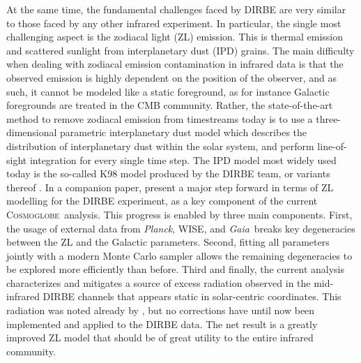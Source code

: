 \documentclass{aa}
\def\Planck{\textit{Planck}}
\def\GAIA{\textit{Gaia}}
\newcommand{\cosmoglobe}{\textsc{Cosmoglobe}}
\begin{document}
At the same time, the fundamental challenges faced by DIRBE are very similar to those faced by any other infrared experiment. In particular, the single most challenging aspect is the zodiacal light (ZL) emission. This is thermal emission and scattered sunlight from interplanetary dust (IPD) grains. The main difficulty when dealing with zodiacal emission contamination in infrared data is that the observed emission is highly dependent on the position of the observer, and as such, it cannot be modeled like a static foreground, as for instance Galactic foregrounds are treated in the CMB community. Rather, the state-of-the-art method to remove zodiacal emission from timestreams today is to use a three-dimensional parametric interplanetary dust model which describes the distribution of interplanetary dust within the solar system, and perform line-of-sight integration for every single time step. The IPD model most widely used today is the so-called K98 model \citep{kelsall1998} produced by the DIRBE team, or variants thereof \citep[e.g.,][]{planck2013-pip88}. In a companion paper, \citet{CG02_02} present a major step forward in terms of ZL modelling for the DIRBE experiment, as a key component of the current \cosmoglobe\ analysis. This progress is enabled by three main components. First, the usage of external data from \Planck, WISE, and \GAIA\ breaks key degeneracies between the ZL and the Galactic parameters. Second, fitting all parameters jointly with a modern Monte Carlo sampler allows the remaining degeneracies to be explored more efficiently than before. Third and finally, the current analysis characterizes and mitigates a source of excess radiation observed in the mid-infrared DIRBE channels that appears static in solar-centric coordinates. This radiation was noted already by \citet{leinert:1998}, but no corrections have until now been implemented and applied to the DIRBE data. The net result is a greatly improved ZL model that should be of great utility to the entire infrared community.
\end{document}
